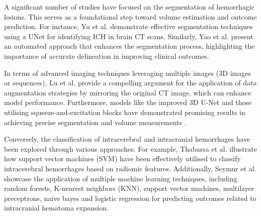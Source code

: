 

A significant number of studies have focused on the segmentation of hemorrhagic lesions. This serves as a foundational step toward volume estimation and outcome prediction. For instance, Yu et al. \cite{Yu2022} demonstrate effective segmentation techniques using a UNet for identifying ICH in brain CT scans. Similarly, Yao et al. \cite{YAO2020101910} present an automated approach that enhances the segmentation process, highlighting the importance of accurate delineation in improving clinical outcomes.


In terms of advanced imaging techniques leveraging multiple images (3D images or sequences), Lu et al. \cite{9210782} provide a compelling argument for the application of data augmentation strategies by mirroring the original CT image, which can enhance model performance. Furthermore, models like the improved 3D U-Net and those utilising squeeze-and-excitation blocks have demonstrated promising results in achieving precise segmentation and volume measurements \cite{ABRAMOVA2021101908}.


Conversely, the classification of intracerebral and intracranial hemorrhages have been explored through various approaches. For example, Thabarsa et al. \cite{Thabarsa2023299} illustrate how support vector machines (SVM) have been effectively utilised to classify intracerebral hemorrhages based on radiomic features. Additionally, Seymur et al. \cite{Seymour2022} showcase the application of multiple machine learning techniques, including random forests, K-nearest neighbors (KNN), support vector machines, multilayer preceptrons, naive bayes and logistic regression for predicting outcomes related to intracranial hematoma expansion.

